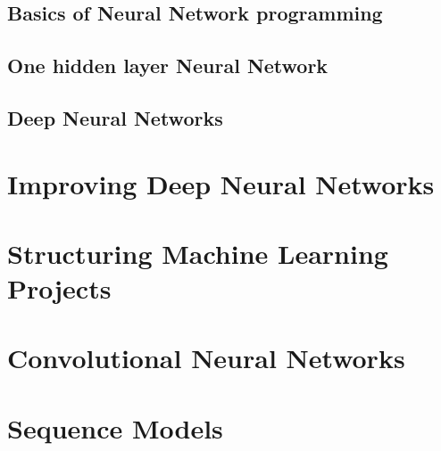 \documentclass{article}
\begin{document}
\subsection{Basics of Neural Network programming}
\subsection{One hidden layer Neural Network}
\subsection{Deep Neural Networks}

\section{Improving Deep Neural Networks}
\section{Structuring Machine Learning Projects}
\section{Convolutional Neural Networks}
\section{Sequence Models}
\end{document}

